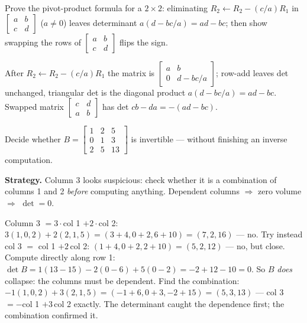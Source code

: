 \begin{exercise}[hard]\label{ex:det-h1}
Prove the pivot-product formula for a $2\times2$: eliminating
$R_2\leftarrow R_2-(c/a)R_1$ in $\begin{bmatrix}a&b\\c&d\end{bmatrix}$
($a\ne0$) leaves determinant $a(d-bc/a)=ad-bc$; then show swapping the rows
of $\begin{bmatrix}a&b\\c&d\end{bmatrix}$ flips the sign.
\begin{solution}
After $R_2\leftarrow R_2-(c/a)R_1$ the matrix is
$\begin{bmatrix}a&b\\0&d-bc/a\end{bmatrix}$; row-add leaves det unchanged,
triangular det is the diagonal product $a(d-bc/a)=ad-bc$. Swapped matrix
$\begin{bmatrix}c&d\\a&b\end{bmatrix}$ has det $cb-da=-(ad-bc)$.
\end{solution}
\end{exercise}

\begin{example}\label{ex:detzero}
Decide whether
\(B=\begin{bmatrix}1&2&5\\0&1&3\\2&5&13\end{bmatrix}\)
is invertible --- without finishing an inverse computation.
\par\smallskip
\textbf{Strategy.} Column 3 looks suspicious: check whether it is a
combination of columns 1 and 2 \emph{before} computing anything.
Dependent columns $\Rightarrow$ zero volume $\Rightarrow$ $\det=0$.
\begin{solution}
Column 3 $=3\cdot$col 1 $+2\cdot$col 2:
$3(1,0,2)+2(2,1,5)=(3+4,0+2,6+10)=(7,2,16)$ --- no. Try instead
col 3 $=$ col 1 $+2\,$col 2: $(1+4,0+2,2+10)=(5,2,12)$ --- no, but
close. Compute directly along row 1:
$\det B=1(13-15)-2(0-6)+5(0-2)=-2+12-10=0$. So $B$ \emph{does}
collapse: the columns must be dependent. Find the combination:
$-1(1,0,2)+3(2,1,5)=(-1+6,0+3,-2+15)=(5,3,13)$ ---
col 3 $=-$col 1 $+3\,$col 2 exactly. The determinant caught the
dependence first; the combination confirmed it. \checkmark
\end{solution}
\end{example}

